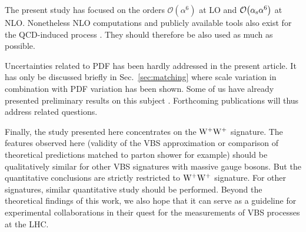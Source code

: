 The present study has focused on the orders $\mathcal{O}{\left(\alpha^{6}\right)}$ at LO and $\mathcal{O}{\left(\alpha_\text{s}\alpha^{6}\right)}$ at NLO.
Nonetheless NLO computations and publicly available tools also exist for the QCD-induced process \cite{Rauch:2016pai,Melia:2010bm,Melia:2011gk,Campanario:2013gea,Baglio:2014uba,Biedermann:2017bss}.
They should therefore be also used as much as possible.

Uncertainties related to PDF has been hardly addressed in the present article.
It has only be discussed briefly in Sec.~\ref{sec:matching} where scale variation in combination with PDF variation has been shown.
Some of us have already presented preliminary results on this subject \cite{Schwan:2017yy}. %
Forthcoming publications will thus address related questions.

Finally, the study presented here concentrates on the ${\rm W}^+{\rm W}^+$ signature.
The features observed here (validity of the VBS approximation or comparison of theoretical predictions matched to parton shower for example) should be qualitatively similar for other VBS signatures with massive gauge bosons.
But the quantitative conclusions are strictly restricted to ${\rm W}^+{\rm W}^+$ signature.
For other signatures, similar quantitative study should be performed.
Beyond the theoretical findings of this work, we also hope that it can serve as a guideline for experimental collaborations in their quest for the measurements of VBS processes at the LHC.